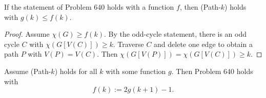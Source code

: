\begin{lemma}
If the statement of Problem 640 holds with a function $f$, then (Path-$k$) holds with $g(k)\le f(k)$.
\end{lemma}
\begin{proof}
Assume $\chi(G)\ge f(k)$.
By the odd-cycle statement, there is an odd cycle $C$ with $\chi(G[V(C)])\ge k$.
Traverse $C$ and delete one edge to obtain a path $P$ with $V(P)=V(C)$.
Then $\chi(G[V(P)])=\chi(G[V(C)])\ge k$.
\end{proof}

\begin{lemma}
Assume (Path-$k$) holds for all $k$ with some function $g$.
Then Problem 640 holds with
\[
  f(k) := 2g(k+1)-1.
\]
\end{lemma}
